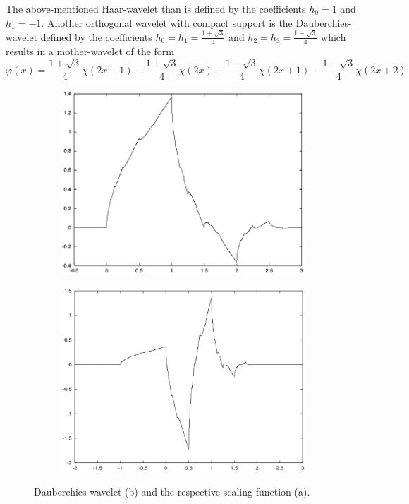 The above-mentioned Haar-wavelet than is defined by the coefficients $h_0=1$ and $h_1=-1$.
Another orthogonal wavelet with compact support is the Dauberchies-wavelet defined by the coefficients $h_0=h_1=\frac {1+\sqrt{3}}{4}$ and $h_2=h_3=\frac{1-\sqrt{3}}{4}$ which results in a mother-wavelet of the form
\begin{equation}
\varphi(x)=\frac{1+\sqrt{3}}{4}\chi(2x-1) - \frac{1+\sqrt{3}}{4} \chi(2x)
          +\frac{1-\sqrt{3}}{4}\chi(2x+1) - \frac{1-\sqrt{3}}{4} \chi(2x+2)
\end{equation}
\begin{figure}
   \begin{subfigure}{0.48\textwidth}
   \includegraphics[width=\textwidth]{Figures/dauberchiesSF}
   \end{subfigure}
   \begin{subfigure}{0.48\textwidth}
   \includegraphics[width=\textwidth]{Figures/dauberchiesWave}
   \end{subfigure}
   \label{fig:wavelets}
   \caption{Dauberchies wavelet (b) and the respective scaling function (a).}
\end{figure}
